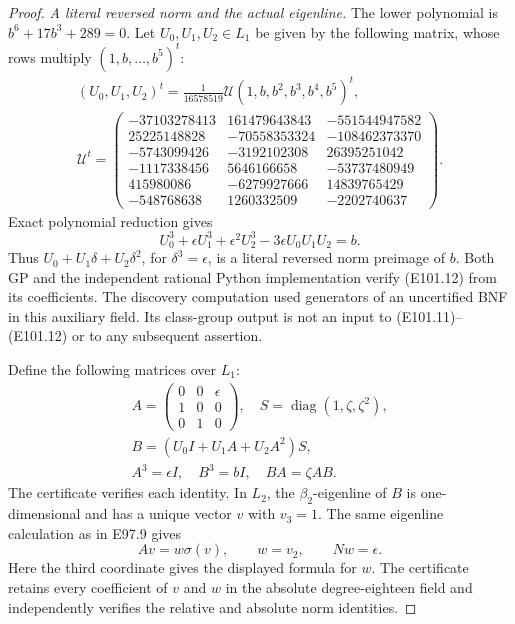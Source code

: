 \begin{proof}
\emph{A literal reversed norm and the actual eigenline.}
The lower polynomial is \(b^6+17b^3+289=0\).
Let \(U_0,U_1,U_2\in L_1\) be given by the following
matrix, whose rows multiply \((1,b,\ldots,b^5)^t\):
\[
 \begin{gathered}
 (U_0,U_1,U_2)^t=\frac1{16578519}\mathcal U
       (1,b,b^2,b^3,b^4,b^5)^t,\\
 \mathcal U^t=\begin{pmatrix}
 -37103278413&161479643843&-551544947582\\
 25225148828&-70558353324&-108462373370\\
 -5743099426&-3192102308&26395251042\\
 -1117338456&5646166658&-53737480949\\
 415980086&-6279927666&14839765429\\
 -548768638&1260332509&-2202740637
 \end{pmatrix}.
 \end{gathered}
 \tag{E101.11}
\]
Exact polynomial reduction gives
\[
 U_0^3+\epsilon U_1^3+\epsilon^2U_2^3
          -3\epsilon U_0U_1U_2=b.
 \tag{E101.12}
\]
Thus \(U_0+U_1\delta+U_2\delta^2\), for
\(\delta^3=\epsilon\), is a literal reversed norm
preimage of \(b\). Both GP and the independent rational
Python implementation verify (E101.12) from its coefficients.
The discovery computation used generators of an
uncertified BNF in this auxiliary field. Its class-group
output is not an input to (E101.11)--(E101.12) or to
any subsequent assertion.

Define the following matrices over \(L_1\):
\[
 \begin{gathered}
 A=\begin{pmatrix}0&0&\epsilon\\1&0&0\\0&1&0\end{pmatrix},
 \quad S=\operatorname{diag}(1,\zeta,\zeta^2),\\
 B=(U_0I+U_1A+U_2A^2)S,\\
 A^3=\epsilon I,\quad B^3=bI,\quad BA=\zeta AB.
 \end{gathered}
 \tag{E101.13}
\]
The certificate verifies each identity. In \(L_2\), the
\(\beta_2\)-eigenline of \(B\) is one-dimensional and
has a unique vector \(v\) with \(v_3=1\).
The same eigenline calculation as in E97.9 gives
\[
       Av=w\sigma(v),\qquad w=v_2,\qquad Nw=\epsilon.
 \tag{E101.14}
\]
Here the third coordinate gives the displayed formula
for \(w\). The certificate retains every coefficient
of \(v\) and \(w\) in the absolute degree-eighteen
field and independently verifies the relative and
absolute norm identities.


\end{proof}
